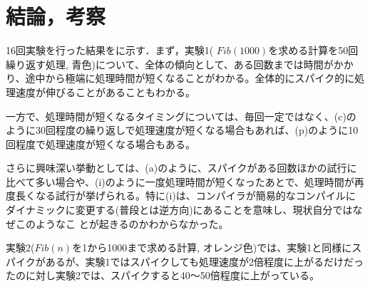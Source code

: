 \documentclass[onecolumn]{preport}
\begin{document}
\section{結論，考察}
16回実験を行った結果をに示す．まず，実験1( $Fib(1000)$を求める計算を50回繰り返す処理, 青色)について、全体の傾向として、ある回数までは時間がかかり、途中から極端に処理時間が短くなることがわかる。全体的にスパイク的に処理速度が伸びることがあることもわかる。

一方で、処理時間が短くなるタイミングについては、毎回一定ではなく、(c)のように30回程度の繰り返しで処理速度が短くなる場合もあれば、(p)のように10回程度で処理速度が短くなる場合もある。

さらに興味深い挙動としては、(a)のように、スパイクがある回数ほかの試行に比べて多い場合や、(i)のように一度処理時間が短くなったあとで、処理時間が再度長くなる試行が挙げられる。特に(i)は、コンパイラが簡易的なコンパイルにダイナミックに変更する(普段とは逆方向)にあることを意味し、現状自分ではなぜこのようなこ
とが起きるのかわからなかった。

実験2($Fib(n)$を1から1000まで求める計算, オレンジ色)では、実験1と同様にスパイクがあるが、実験1ではスパイクしても処理速度が2倍程度に上がるだけだったのに対し実験2では、スパイクすると40〜50倍程度に上がっている。
\end{document}
